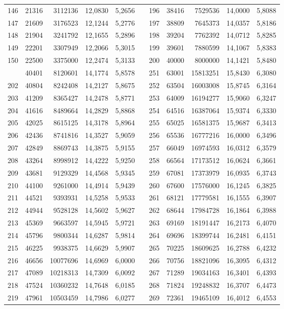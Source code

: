 \begin{longtable}{rrrrrrrrrrr}
146&21316&3112136&12,0830&5,2656&&196&38416&7529536&14,0000&5,8088\\
147&21609&3176523&12,1244&5,2776&&197&38809&7645373&14,0357&5,8186\\
148&21904&3241792&12,1655&5,2896&&198&39204&7762392&14,0712&5,8285\\
149&22201&3307949&12,2066&5,3015&&199&39601&7880599&14,1067&5,8383\\
150&22500&3375000&12,2474&5,3133&&200&40000&8000000&14,1421&5,8480\\
\newpage
201&40401&8120601&14,1774&5,8578&&251&63001&15813251&15,8430&6,3080\\
202&40804&8242408&14,2127&5,8675&&252&63504&16003008&15,8745&6,3164\\
203&41209&8365427&14,2478&5,8771&&253&64009&16194277&15,9060&6,3247\\
204&41616&8489664&14,2829&5,8868&&254&64516&16387064&15,9374&6,3330\\
205&42025&8615125&14,3178&5,8964&&255&65025&16581375&15,9687&6,3413\\
206&42436&8741816&14,3527&5,9059&&256&65536&16777216&16,0000&6,3496\\
207&42849&8869743&14,3875&5,9155&&257&66049&16974593&16,0312&6,3579\\
208&43264&8998912&14,4222&5,9250&&258&66564&17173512&16,0624&6,3661\\
209&43681&9129329&14,4568&5,9345&&259&67081&17373979&16,0935&6,3743\\
210&44100&9261000&14,4914&5,9439&&260&67600&17576000&16,1245&6,3825\\
211&44521&9393931&14,5258&5,9533&&261&68121&17779581&16,1555&6,3907\\
212&44944&9528128&14,5602&5,9627&&262&68644&17984728&16,1864&6,3988\\
213&45369&9663597&14,5945&5,9721&&263&69169&18191447&16,2173&6,4070\\
214&45796&9800344&14,6287&5,9814&&264&69696&18399744&16,2481&6,4151\\
215&46225&9938375&14,6629&5,9907&&265&70225&18609625&16,2788&6,4232\\
216&46656&10077696&14,6969&6,0000&&266&70756&18821096&16,3095&6,4312\\
217&47089&10218313&14,7309&6,0092&&267&71289&19034163&16,3401&6,4393\\
218&47524&10360232&14,7648&6,0185&&268&71824&19248832&16,3707&6,4473\\
219&47961&10503459&14,7986&6,0277&&269&72361&19465109&16,4012&6,4553\\

\end{longtable}
